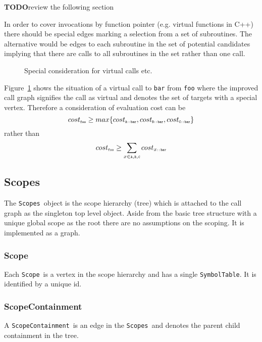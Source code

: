 \documentclass{book}
\newcommand{\fig}[1]{Figure~#1}
\newcommand{\todo}{{\bf TODO}}
\newcommand{\Scope}{{\tt Scope}}
\newcommand{\ScopeContainment}{{\tt ScopeContainment}}
\newcommand{\Scopes}{{\tt Scopes}}
\newcommand{\SymbolTable}{{\tt SymbolTable}}
\begin{document}
\todo review the following section

In order to cover invocations by function pointer (e.g. virtual functions in C++) 
there should be special edges marking a selection from a set of subroutines. The alternative would be edges
to each subroutine in the set of potential candidates implying that there are calls to all subroutines in 
the set rather than one call. 

\begin{figure}
\centering {}
\caption{Special consideration for virtual calls etc.}
\label{fig:virtualCall}
\end{figure}

\fig{\ref{fig:virtualCall}} shows the situation of a virtual call to {\tt bar} from 
{\tt foo} where the improved call graph signifies the call as virtual and denotes the 
set of targets with a special vertex.
Therefore a consideration of evaluation cost can be 
\[
cost_{\mbox{\tiny \tt foo}}\geq max\{cost_{\mbox{\tiny \tt A::bar}},cost_{\mbox{\tiny \tt B::bar}},cost_{\mbox{\tiny \tt C::bar}}\}
\]
rather than 
\[
cost_{\mbox{\tiny \tt foo}}\geq \sum\limits_{x \in \mbox{\tiny \tt A,B,C}} cost_{x\mbox{\tiny\tt ::bar}}
\]



\subsection{Scopes}
\label{ssec:Scopes}

The \Scopes\ object is the scope hierarchy (tree) which 
is attached to the call graph as the singleton top level object. 
Aside from the basic tree structure with a unique global 
scope as the root there are 
no assumptions on the scoping. 
It is implemented as a graph.

\subsubsection{Scope} 
Each \Scope\ is a vertex in the scope hierarchy and has a single 
\SymbolTable. 
It is identified by a unique id. 

\subsubsection{ScopeContainment} 
A \ScopeContainment\ is an edge in the \Scopes\ and 
denotes the parent child containment in the tree.
\end{document}
